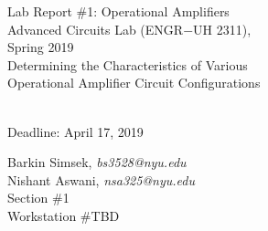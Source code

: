 \documentclass[journal]{IEEEtran}
\begin{document}
\begin{titlepage}
    {\centering
        \vspace*{20em}
        {
        \huge 
        \begin{spacing}{1.5}
            Lab Report \#1: Operational Amplifiers
            \\
            Advanced Circuits Lab (ENGR$-$UH 2311),\\
            Spring 2019
            \bigskip
            \Large
            \\
            Determining the Characteristics of Various\\
            Operational Amplifier Circuit Configurations
  
            \\
            \bigskip
            Deadline: April 17, 2019 
        \end{spacing}

        }
        
    }
    \vfill
    
    {
    \large
    
    \begin{spacing}{1.5}
    \noindent Barkin Simsek, {\it {bs3528@nyu.edu}} 
    \\
    Nishant Aswani, {\it {nsa325@nyu.edu}}
    \\
    Section \#1%
    \\
    Workstation \#TBD%
    \end{spacing}
    }


\end{titlepage}
{}
\setcounter{page}{1}




%
{}


\begin{abstract}
In this experiment, four different opamp amplifier circuits were built using National Semiconductors LM741 opamps: Inverting Amplifier, Non-Inverting Amplifier, Cascading of Amplifiers, and Summing Amplifier circuits. For testing, 1 V at 1 KHz was applied separately to each circuit. It was observed that produced circuits meet the calculated gain values. It was also determined that the produced opamp amplifier circuits can be used in a wide variety of applications such as increasing radio signals in a radio receiver or cancelling the ambient noise in a noise cancelling headphone.
\end{abstract}
\end{document}
